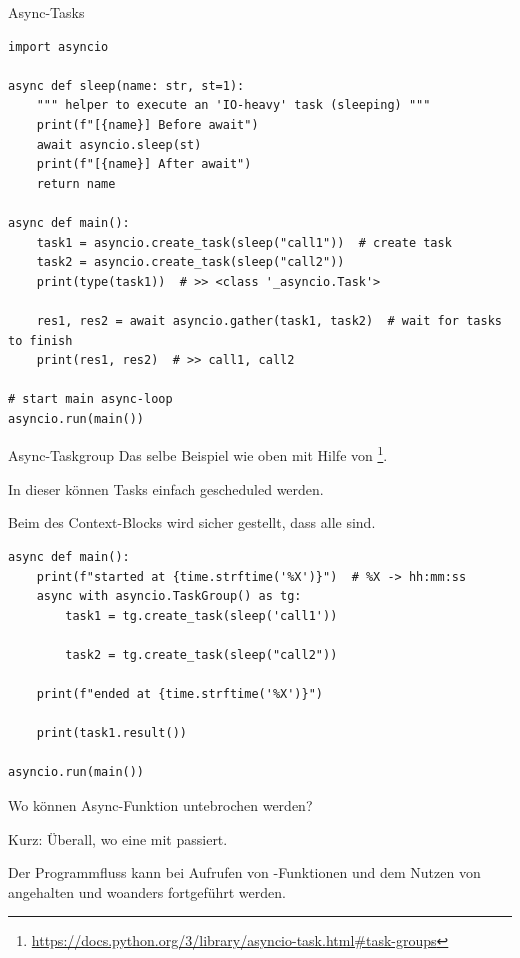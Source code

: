 \documentclass[12pt, aspectratio=169, usepdftitle=false, handout]{beamer}
\newcommand{\pp}[1]{\lpl{#1}}
\newcommand{\furl}[1]{\footnote{\url{#1}}}
\begin{document}
\begin{frame}[fragile]{Async-Tasks}
	\begin{lstlisting}[language=pytiny]
import asyncio

async def sleep(name: str, st=1):
    """ helper to execute an 'IO-heavy' task (sleeping) """
    print(f"[{name}] Before await")
    await asyncio.sleep(st)
    print(f"[{name}] After await")
    return name

async def main():
    task1 = asyncio.create_task(sleep("call1"))  # create task
    task2 = asyncio.create_task(sleep("call2"))
    print(type(task1))  # >> <class '_asyncio.Task'>

    res1, res2 = await asyncio.gather(task1, task2)  # wait for tasks to finish
    print(res1, res2)  # >> call1, call2

# start main async-loop
asyncio.run(main())
	\end{lstlisting}

\end{frame}


\begin{frame}[fragile]{Async-Taskgroup}
        Das selbe Beispiel wie oben mit Hilfe von \furl{https://docs.python.org/3/library/asyncio-task.html\#task-groups}.

		\medskip
		
		In dieser können  Tasks einfach gescheduled werden.
		
		\medskip
		
		Beim  des Context-Blocks wird sicher gestellt, dass alle  sind.

	\begin{lstlisting}[language=pytiny]
async def main():
    print(f"started at {time.strftime('%X')}")  # %X -> hh:mm:ss
    async with asyncio.TaskGroup() as tg:
        task1 = tg.create_task(sleep('call1'))

        task2 = tg.create_task(sleep("call2"))

    print(f"ended at {time.strftime('%X')}")

    print(task1.result())
    
asyncio.run(main())
	\end{lstlisting}

\end{frame}


\begin{frame}{Wo können Async-Funktion untebrochen werden?}

		Kurz: Überall, wo eine  mit \pp{asyncio} passiert.
		
		\medskip
		
		 Der Programmfluss kann bei Aufrufen von \pp{async}-Funktionen und dem Nutzen von \pp{await} angehalten und woanders fortgeführt werden.

\end{frame}
\end{document}
